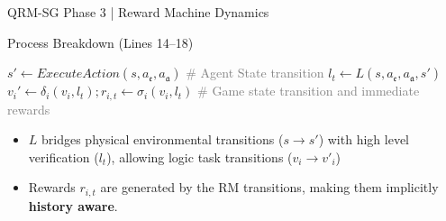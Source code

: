 \documentclass[10pt, aspectratio=169]{beamer}
\newcommand{\evidenzia}[1]{\textcolor{verdeSalvia}{\textbf{#1}}}
\begin{document}
\begin{frame}{QRM-SG Phase 3 | Reward Machine Dynamics}
    \begin{block}{Process Breakdown (Lines 14--18)}
    \vspace{0.2cm}
        \begin{algorithmic}
        \STATE $s' \leftarrow ExecuteAction(s, a_{\mathfrak{e}}, a_{\mathfrak{a}})$ \textcolor{gray}{\footnotesize \textcolor{gray}{\# Agent State transition}}
        \STATE $l_t \leftarrow L(s, a_{\mathfrak{e}}, a_{\mathfrak{a}}, s')$ 
            \STATE $v_i' \leftarrow \delta_i(v_i, l_t); r_{i,t} \leftarrow \sigma_i(v_i, l_t)$ {\footnotesize \textcolor{gray}{\# Game state transition and immediate rewards}}
        \ENDFOR
    
    \end{algorithmic}
    \end{block}
    \vspace{0.3cm}
    \begin{itemize}
        \item $L$ bridges physical environmental transitions ($s \to s'$) with high level verification ($l_t$), allowing logic task transitions ($v_i\rightarrow v'_i$)
        \item Rewards $r_{i,t}$ are generated by the RM transitions, making them implicitly \evidenzia{history aware}. 
    \end{itemize}
\end{frame}
\end{document}
